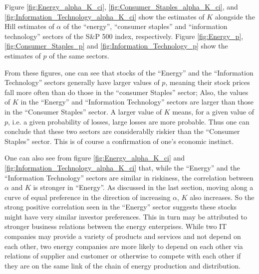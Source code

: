 \documentclass{article}
\begin{document}
Figure \ref{fig:Energy_alpha_K_ci},
\ref{fig:Consumer_Staples_alpha_K_ci},
and \ref{fig:Information_Technology_alpha_K_ci}
show the estimates of $K$ alongside the Hill estimates of $\alpha$ of
the ``energy'', ``consumer staples'' and ``information technology''
sectors of the S\&P 500 index, respectively.
Figure \ref{fig:Energy_p}, \ref{fig:Consumer_Staples_p} and
\ref{fig:Information_Technology_p} show the estimates of $p$ of the
same sectors.

From these figures, one can see that stocks of the ``Energy'' and the
``Information Technology'' sectors generally have larger values of
$p$, meaning their stock prices fall more often than do those in the
``consumer Staples'' sector; Also, the values of $K$ in the ``Energy''
and ``Information Technology'' sectors are larger than those in the
``Consumer Staples'' sector. A larger value of $K$ means, for a given
value of $p$, i.e. a given probability of losses, large losses are
more probable. Thus one can conclude that these two sectors are
considerablly riskier than the ``Consumer Staples'' sector. This is of
course a confirmation of one's economic instinct.

One can also see from figure \ref{fig:Energy_alpha_K_ci}
and \ref{fig:Information_Technology_alpha_K_ci} that, while the
``Energy'' and the ``Information Technology'' sectors are similar in
riskiness, the correlation between $\alpha$ and $K$ is stronger in
``Energy''. As discussed in the last section, moving along a curve of
equal preference in the direction of increasing $\alpha$, $K$ also
increases. So the strong positive correlation seen in the ``Energy''
sector suggests these stocks might have very similar investor
preferences. This in turn may be attributed to stronger business
relations between the energy enterprises. While two IT companies
may provide a variety of products and services and not depend on each
other, two energy companies are more likely to depend on each other
via relations of supplier and customer or otherwise to compete with each
other if they are on the same link of the chain of energy production
and distribution.
\end{document}
